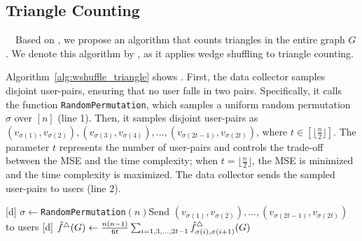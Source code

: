 \subsection{Triangle Counting}
\label{sub:triangle}
~~Based on
\AlgWSLE{},
we propose an algorithm that counts triangles in the entire graph $G$.
We denote this algorithm by \AlgWSTri{}, as it applies wedge shuffling to triangle counting.

Algorithm~\ref{alg:wshuffle_triangle} shows \AlgWSTri{}.
First, the data collector samples disjoint user-pairs, 
ensuring that no user falls in two pairs. 
Specifically, it calls the function \texttt{RandomPermutation}, which samples a uniform random permutation $\sigma$ over $[n]$ (line 1).
Then, it samples disjoint user-pairs as
$(v_{\sigma(1)}, v_{\sigma(2)}), (v_{\sigma(3)}, v_{\sigma(4)}), \ldots, (v_{\sigma(2t-1)}, \allowbreak v_{\sigma(2t)})$, where $t \in [\lfloor \frac{n}{2} \rfloor]$.
The parameter $t$ represents the number of user-pairs and controls the trade-off between the MSE and the time complexity;
when $t = \lfloor \frac{n}{2} \rfloor$, the MSE is minimized and the time complexity is maximized.
The data collector sends the sampled user-pairs to users (line 2).

\setlength{\algomargin}{5mm}
\begin{algorithm}[t]
  \SetAlgoLined
  [d] $\sigma \leftarrow$\texttt{RandomPermutation}$(n)$\;
  [d] Send $(v_{\sigma(1)}, v_{\sigma(2)}), \ldots, (v_{\sigma(2t-1)}, v_{\sigma(2t)})$ to users\;
  [d] $\hat{f}^\triangle(G) \leftarrow \frac{n(n-1)}{6t} \sum_{i=1, 3, \ldots, 2t-1} \hat{f}_{\sigma(i),\sigma(i+1)}^\triangle(G)$\;
  [d] 
  \caption{Our triangle counting algorithm \AlgWSTri{}.
  \AlgWSLE{} is shown in Algorithm~\ref{alg:WSLE}.
  }\label{alg:wshuffle_triangle}
\end{algorithm}

